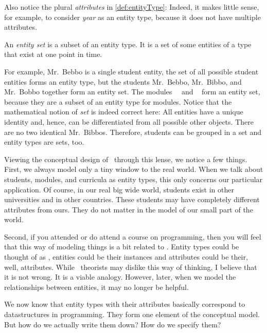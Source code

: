 Also notice the plural \emph{attributes} in \cref{def:entityType}:%
%
Indeed, it makes little sense, for example, to consider \emph{year} as an entity type, because it does not have multiple attributes.%
%
\begin{definition}%
An \emph{entity set} is a subset of an entity type. %
It is a set of some entities of a type that exist at one point in time.%
\end{definition}%
%
For example, Mr.~Bebbo is a single student entity, the set of all possible student entities forms an entity type, but the students Mr.~Bebbo, Mr.~Bibbo, and Mr.~Bobbo together form an entity set.
The modules~~\cite{programmingWithPython} and ~\cite{databases} form an entity set, because they are a subset of an entity type for modules.
Notice that the mathematical notion of \emph{set} is indeed correct here:
All entities have a unique identity and, hence, can be differentiated from all possible other objects.
There are no two identical Mr.~Bibbos.
Therefore, students can be grouped in a set and entity types are sets, too.

Viewing the conceptual design of \dbs\ through this lense, we notice a few things.
First, we always model only a tiny window to the real world.
When we talk about students, modules, and curricula as entity types, this only concerns our particular application.
Of course, in our real big wide world, students exist in other universities and in other countries.
These students may have completely different attributes from ours.
They do not matter in the model of our small part of the world.

Second, if you attended or do attend a course on programming, then you will feel that this way of modeling things is a bit related to .
Entity types could be thought of as , entities could be their instances and attributes could be their, well, attributes.
While \db\ theorists may dislike this way of thinking, I believe that it is not wrong.
It is a viable analogy.
However, later, when we model the relationships between entities, it may no longer be helpful.

We now know that entity types with their attributes basically correspond to datastructures in programming.
They form one element of the conceptual model.
But how do we actually write them down?
How do we specify them?

